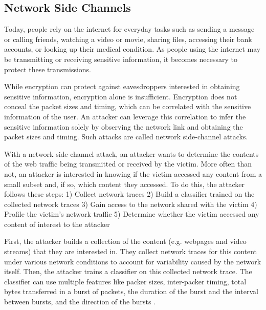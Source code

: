 \subsection{Network Side Channels}
\label{subsec:netshaper-background-network-side-channels}

Today, people rely on the internet for everyday tasks such as sending a message or calling friends, watching a video or movie, sharing files, accessing their bank accounts, or looking up their medical condition.
As people using the internet may be transmitting or receiving sensitive information, it becomes necessary to protect these transmissions.

While encryption can protect against eavesdroppers interested in obtaining sensitive information, encryption alone is insufficient.
Encryption does not conceal the packet sizes and timing, which can be correlated with the sensitive information of the user. 
An attacker can leverage this correlation to infer the sensitive information solely by observing the network link and obtaining the packet sizes and timing.
Such attacks are called network side-channel attacks.

With a network side-channel attack, an attacker wants to determine the contents of the web traffic being transmitted or received by the victim.
More often than not, an attacker is interested in knowing if the victim accessed any content from a small subset and, if so, which content they accessed.
To do this, the attacker follows these steps: 
1) Collect network traces
2) Build a classifier trained on the collected network traces
3) Gain access to the network shared with the victim
4) Profile the victim's network traffic
5) Determine whether the victim accessed any content of interest to the attacker

First, the attacker builds a collection of the content (e.g. webpages and video streams) that they are interested in. 
They collect network traces for this content under various network conditions to account for variability caused by the network itself. 
Then, the attacker trains a classifier on this collected network trace.
The classifier can use multiple features like packer sizes, inter-packer timing, total bytes transferred in a burst of packets, the duration of the burst and the interval between bursts, and the direction of the bursts \cite{schuster2017beautyburst}.

